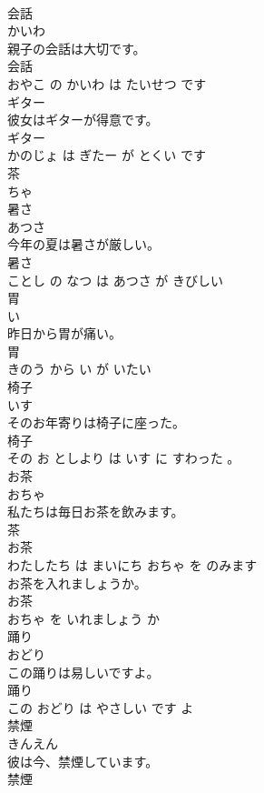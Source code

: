 \documentclass[8pt]{extreport}
\begin{document}
\begin{CJK}{UTF8}{min}
\\	会話	
\\	かいわ			
\\	親子の会話は大切です。	
\\	会話 
\\	おやこ の かいわ は たいせつ です			
\\	ギター	
\\	彼女はギターが得意です。	
\\	ギター 
\\	かのじょ は ぎたー が とくい です			
\\	茶	
\\	ちゃ			
\\	暑さ	
\\	あつさ			
\\	今年の夏は暑さが厳しい。	
\\	暑さ 
\\	ことし の なつ は あつさ が きびしい			
\\	胃	
\\	い			
\\	昨日から胃が痛い。	
\\	胃 
\\	きのう から い が いたい			
\\	椅子	
\\	いす			
\\	そのお年寄りは椅子に座った。	
\\	椅子 
\\	その お としより は いす に すわった 。			
\\	お茶	
\\	おちゃ			
\\	私たちは毎日お茶を飲みます。	
\\	茶 
\\	お茶 
\\	わたしたち は まいにち おちゃ を のみます			
\\	お茶を入れましょうか。	
\\	お茶 
\\	おちゃ を いれましょう か			
\\	踊り	
\\	おどり			
\\	この踊りは易しいですよ。	
\\	踊り 
\\	この おどり は やさしい です よ			
\\	禁煙	
\\	きんえん			
\\	彼は今、禁煙しています。	
\\	禁煙 

\end{CJK}
\end{document}
